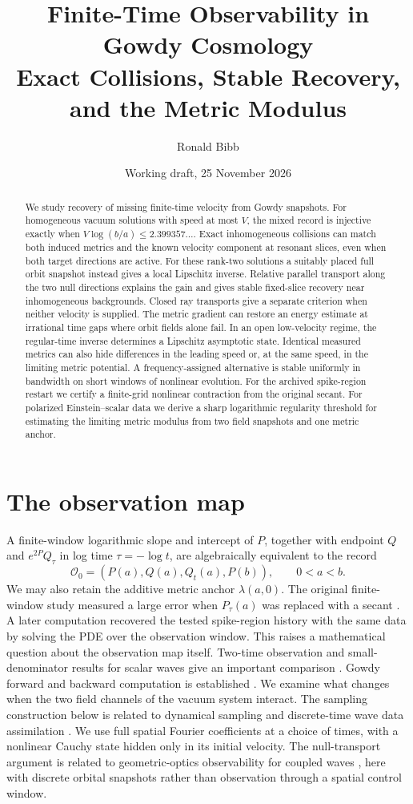 \documentclass[11pt]{article}
\title{Finite-Time Observability in Gowdy Cosmology\protect\\
Exact Collisions, Stable Recovery, and the Metric Modulus}
\author{Ronald Bibb}
\date{Working draft, 25 November 2026}
\begin{document}
\maketitle

\begin{abstract}
We study recovery of missing finite-time velocity from Gowdy
snapshots. For homogeneous vacuum solutions with speed at most
$V$, the mixed record is injective exactly when
$V\log(b/a)\le 2.399357\ldots$. Exact inhomogeneous collisions
can match both induced metrics and the known velocity component
at resonant slices, even when both target directions are active.
For these rank-two solutions a suitably placed full orbit
snapshot instead gives a local Lipschitz inverse. Relative
parallel transport along the two null directions explains
the gain and gives stable fixed-slice recovery near
inhomogeneous backgrounds. Closed ray transports give
a separate criterion when neither velocity is supplied.
The metric gradient can restore an energy estimate at
irrational time gaps where orbit fields alone fail.
In an open low-velocity regime, the regular-time inverse
determines a Lipschitz asymptotic state.
Identical measured metrics can also hide differences in
the leading speed or, at the same speed, in the limiting
metric potential. A frequency-assigned
alternative is stable uniformly in bandwidth on short windows
of nonlinear evolution. For the archived spike-region restart
we certify a finite-grid nonlinear contraction from the original
secant. For polarized Einstein--scalar data we derive a sharp
logarithmic regularity threshold for estimating the limiting
metric modulus from two field snapshots and one metric anchor.
\end{abstract}

\section{The observation map}
A finite-window logarithmic slope and intercept of $P$, together
with endpoint $Q$ and $e^{2P}Q_\tau$ in log time $\tau=-\log t$,
are algebraically equivalent to the record
\[
 \mathcal O_0=(P(a),Q(a),Q_t(a),P(b)),\qquad 0<a<b.
\]
We may also retain the additive metric anchor $\lambda(a,0)$.
The original finite-window study measured a large error when
$P_\tau(a)$ was replaced with a secant \cite{old}.
A later computation recovered the tested spike-region history with
the same data by solving the PDE over the observation window.
This raises a mathematical question about the observation map itself.
Two-time observation and small-denominator results for scalar waves
give an important comparison \cite{vest,cssw}. Gowdy forward and
backward computation is established \cite{amorim}. We examine what
changes when the two field channels of the vacuum system interact.
The sampling construction below is related to dynamical
sampling and discrete-time wave data assimilation
\cite{aldroubi,cindea}. We use full spatial Fourier coefficients
at a choice of times, with a nonlinear Cauchy state hidden
only in its initial velocity. The null-transport argument
is related to geometric-optics observability for coupled
waves \cite{dlr,clw}, here with discrete orbital snapshots
rather than observation through a spatial control window.
\end{document}
